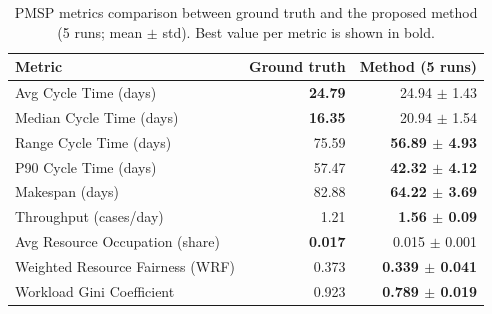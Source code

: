 \begin{table}[htbp]
\scriptsize
\caption{PMSP metrics comparison between ground truth and the proposed method (5 runs; mean $\pm$ std). Best value per metric is shown in bold.}
\label{tab:pmsp-gt-vs-method}
\begin{tabular}{lrr}
\toprule
\textbf{Metric} & \textbf{Ground truth} & \textbf{Method (5 runs)} \\

\midrule
Avg Cycle Time (days) & \textbf{24.79} & 24.94 $\pm$ 1.43 \\
Median Cycle Time (days) & \textbf{16.35} & 20.94 $\pm$ 1.54 \\
Range Cycle Time (days) & 75.59 & \textbf{56.89 $\pm$ 4.93} \\
P90 Cycle Time (days) & 57.47 & \textbf{42.32 $\pm$ 4.12} \\
Makespan (days) & 82.88 & \textbf{64.22 $\pm$ 3.69} \\
Throughput (cases/day) & 1.21 & \textbf{1.56 $\pm$ 0.09} \\
Avg Resource Occupation (share) & \textbf{0.017} & 0.015 $\pm$ 0.001 \\
Weighted Resource Fairness (WRF) & 0.373 & \textbf{0.339 $\pm$ 0.041} \\
Workload Gini Coefficient & 0.923 & \textbf{0.789 $\pm$ 0.019} \\
\bottomrule
\end{tabular}
\end{table}
